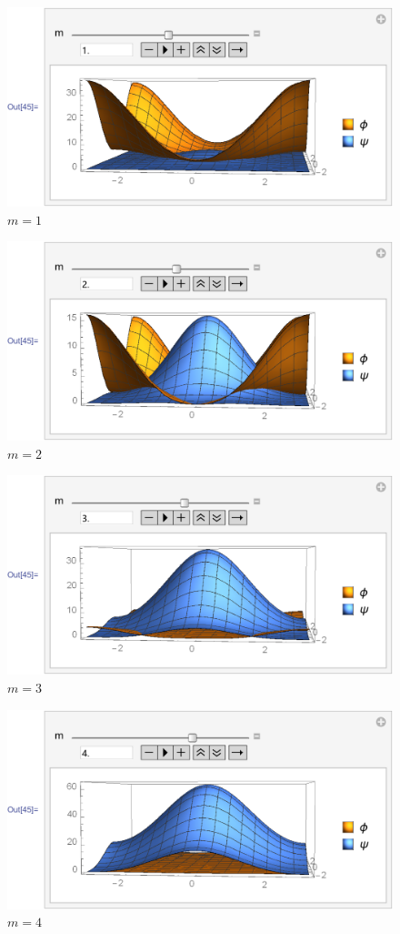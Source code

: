 \documentclass{article}
\begin{document}
    \begin{figure}[H]
        \centering
        \includegraphics[width=0.6\linewidth]{pics/OpenBC-inXY/Eigen-m1.pdf}
        \caption{$m=1$}
    \end{figure}
    \begin{figure}[H]
        \centering
        \includegraphics[width=0.6\linewidth]{pics/OpenBC-inXY/Eigen-m2.pdf}
        \caption{$m=2$}
    \end{figure}
    \begin{figure}[H]
        \centering
        \includegraphics[width=0.6\linewidth]{pics/OpenBC-inXY/Eigen-m3.pdf}
        \caption{$m=3$}
    \end{figure}
    \begin{figure}[H]
        \centering
        \includegraphics[width=0.6\linewidth]{pics/OpenBC-inXY/Eigen-m4.pdf}
        \caption{$m=4$}
    \end{figure}
\end{document}
